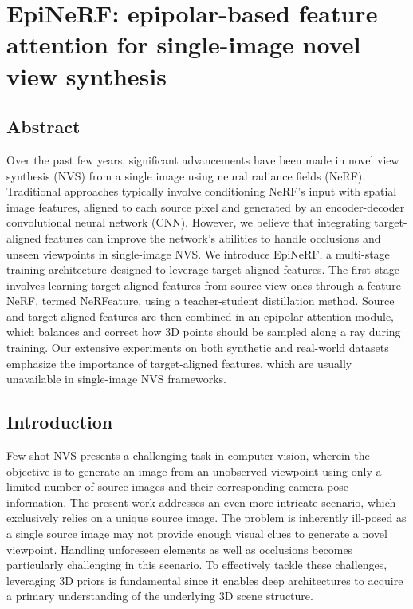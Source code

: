 \chapter{EpiNeRF: epipolar-based feature attention for single-image novel view synthesis}
\label{chapter:epinerf}





\section{Abstract}
\label{sec:epinerf/abstract}
Over the past few years, significant advancements have been made in novel view synthesis (NVS) from a single image using neural radiance fields (NeRF). Traditional approaches typically involve conditioning NeRF's input with spatial image features, aligned to each source pixel and generated by an encoder-decoder convolutional neural network (CNN). However, we believe that integrating target-aligned features can improve the network's abilities to handle occlusions and unseen viewpoints in single-image NVS. We introduce EpiNeRF, a multi-stage training architecture designed to leverage target-aligned features. The first stage involves learning target-aligned features from source view ones through a feature-NeRF, termed NeRFeature, using a teacher-student distillation method. Source and target aligned features are then combined in an epipolar attention module, which balances and correct how 3D points should be sampled along a ray during training. Our extensive experiments on both synthetic and real-world datasets emphasize the importance of target-aligned features, which are usually unavailable in single-image NVS frameworks. 

\section{Introduction}
\label{sec:epinerf/intro}
Few-shot NVS presents a challenging task in computer vision, wherein the objective is to generate an image from an unobserved viewpoint using only a limited number of source images and their corresponding camera pose information. The present work addresses an even more intricate scenario, which exclusively relies on a unique source image. The problem is inherently ill-posed as a single source image may not provide enough visual clues to generate a novel viewpoint. Handling unforeseen elements as well as occlusions becomes particularly challenging in this scenario. To effectively tackle these challenges, leveraging 3D priors \citep{saito2019pifu,johari2022geonerf} is fundamental since it enables deep architectures to acquire a primary understanding of the underlying 3D scene structure. 

